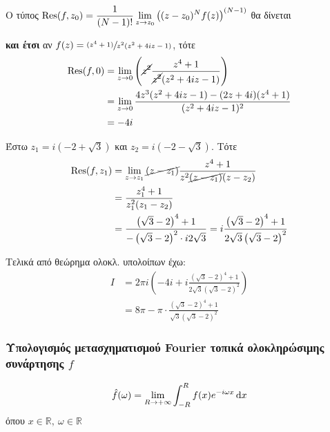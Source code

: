 \documentclass[12pt,a4paper,notitlepage,fleqn]{article}
\begin{document}
\begin{enumgreekparen}
    \begin{attnbox}{}
    	Ο τύπος \( \displaystyle \operatorname{Res}(f,z_0) = \frac{1}{(N-1)!}
    	\lim_{z\to z_0} \left( (z-z_0)^N f(z) \right)^{(N-1)}
    	 \) θα δίνεται
    \end{attnbox}

    \textbf{και έτσι} αν \( f(z) = \sfrac{(z^4+1)}{z^2(z^2+4iz-1)}  \), τότε
    \begin{align*}
    	\operatorname{Res}(f,0) &= \lim_{z\to 0} \left(
    	\cancel{z^2} \frac{z^4+1}{\cancel{z^2}(z^2+4iz-1)}
    	\right) \\ &= \lim_{z\to 0}
    	\frac{4z^3(z^2+4iz-1) - (2z+4i)(z^4+1) }{(z^2+4iz-1)^2}
    	\\ &= -4i
    \end{align*}

    Έστω \( z_1 = i\left(-2+\sqrt{3}\right) \) και \( z_2 = i\left(-2-\sqrt{3}\right) \).
    Τότε
    \begin{align*}
    	\operatorname{Res}(f,z_1) &= \lim_{z\to z_1}
    	\cancel{(z-z_1)}\frac{z^4+1}{z^2\cancel{(z-z_1)}(z-z_2)}
    	\\ &= \frac{z_1^4 + 1}{z_1^2(z_1-z_2)}
    	\\ &= \frac{\left(\sqrt{3}-2\right)^4 + 1}{-\left(\sqrt{3} - 2\right)^2
    		\cdot i 2\sqrt{3}}
    	= i\frac{\left(\sqrt{3}-2\right)^4+1}{2\sqrt{3}\left(\sqrt{3}-2\right)^2}
    \end{align*}

    \item Τελικά από θεώρημα ολοκλ. υπολοίπων έχω:
    \begin{align*}
    	I &= 2\pi i \left( -4i +i
    	\frac{(\sqrt{3}-2)^4+1}{2\sqrt{3}(\sqrt{3}-2)^2}
    	\right) \\ &=
    	8\pi - \pi \cdot \frac{(\sqrt{3}-2)^4 + 1}{\sqrt{3}(\sqrt{3}-2)^2}
    \end{align*}

    \end{enumgreekparen}

    \subsubsection[Υπολογισμός μετασχηματισμού Fourier τοπικά
    ολοκληρώσιμης συνάρτησης f]{Υπολογισμός
    	μετασχηματισμού Fourier τοπικά ολοκληρώσιμης συνάρτησης \( f \)}
    \[
    \hat f(\omega) = \lim_{R\to +\infty} \int_{-R}^{R} f(x) e^{-i\omega x}\mathop{}\!\mathrm{d} x
    \]
    όπου \( x \in \mathbb R,\ \omega \in \mathbb R \)
\end{document}
